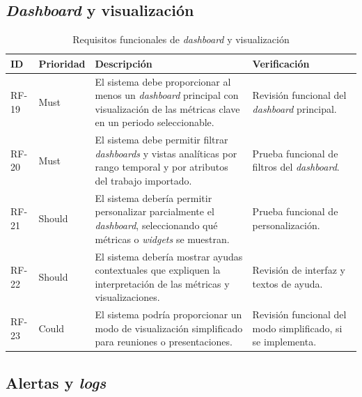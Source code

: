 \subsection{\textit{Dashboard} y visualización}

{\renewcommand{\arraystretch}{1.28}\footnotesize
\begin{longtable}{p{1.35cm}p{1.65cm}p{6.9cm}p{2.9cm}}
\caption{Requisitos funcionales de \textit{dashboard} y visualización}\label{tab:rf-dashboard-visualizacion}\\
\toprule
\textbf{ID} & \textbf{Prioridad} & \textbf{Descripción} & \textbf{Verificación} \\
\midrule
RF-19 & Must & El sistema debe proporcionar al menos un \textit{dashboard} principal con visualización de las métricas clave en un periodo seleccionable. & Revisión funcional del \textit{dashboard} principal. \\
RF-20 & Must & El sistema debe permitir filtrar \textit{dashboards} y vistas analíticas por rango temporal y por atributos del trabajo importado. & Prueba funcional de filtros del \textit{dashboard}. \\
RF-21 & Should & El sistema debería permitir personalizar parcialmente el \textit{dashboard}, seleccionando qué métricas o \textit{widgets} se muestran. & Prueba funcional de personalización. \\
RF-22 & Should & El sistema debería mostrar ayudas contextuales que expliquen la interpretación de las métricas y visualizaciones. & Revisión de interfaz y textos de ayuda. \\
RF-23 & Could & El sistema podría proporcionar un modo de visualización simplificado para reuniones o presentaciones. & Revisión funcional del modo simplificado, si se implementa. \\
\bottomrule
\end{longtable}
\vspace{0.45em}
}

\subsection{Alertas y \textit{logs}}

